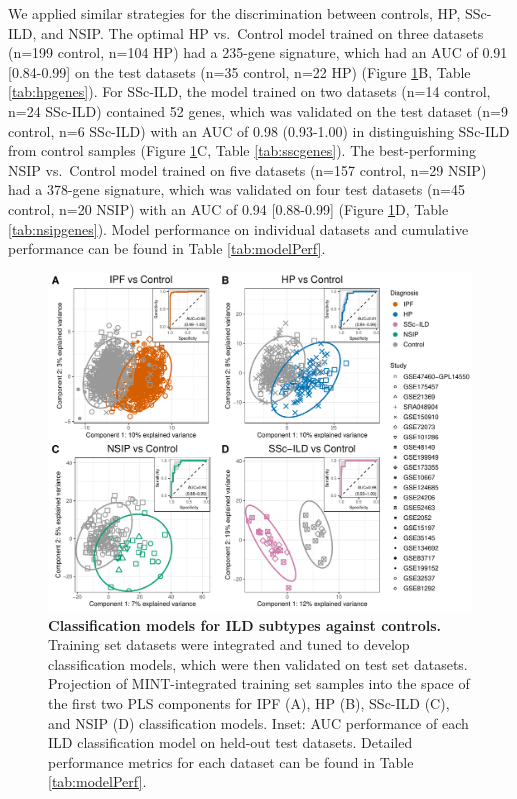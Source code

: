 \documentclass[
]{article}
\begin{document}
We applied similar strategies for the discrimination between controls, HP, SSc-ILD, and NSIP. The optimal HP vs.~Control model trained on three datasets (n=199 control, n=104 HP) had a 235-gene signature, which had an AUC of 0.91 {[}0.84-0.99{]} on the test datasets (n=35 control, n=22 HP) (Figure \ref{fig:mintmodel}B, Table \ref{tab:hpgenes}). For SSc-ILD, the model trained on two datasets (n=14 control, n=24 SSc-ILD) contained 52 genes, which was validated on the test dataset (n=9 control, n=6 SSc-ILD) with an AUC of 0.98 (0.93-1.00) in distinguishing SSc-ILD from control samples (Figure \ref{fig:mintmodel}C, Table \ref{tab:sscgenes}). The best-performing NSIP vs.~Control model trained on five datasets (n=157 control, n=29 NSIP) had a 378-gene signature, which was validated on four test datasets (n=45 control, n=20 NSIP) with an AUC of 0.94 {[}0.88-0.99{]} (Figure \ref{fig:mintmodel}D, Table \ref{tab:nsipgenes}). Model performance on individual datasets and cumulative performance can be found in Table \ref{tab:modelPerf}.



\begin{figure}

{\centering \includegraphics[width=1\linewidth,]{./Figures/SysReview/Figure3_MINT} 

}

\caption[MINT models]{\textbf{Classification models for ILD subtypes against controls.} Training set datasets were integrated and tuned to develop classification models, which were then validated on test set datasets. Projection of MINT-integrated training set samples into the space of the first two PLS components for IPF (A), HP (B), SSc-ILD (C), and NSIP (D) classification models. Inset: AUC performance of each ILD classification model on held-out test datasets. Detailed performance metrics for each dataset can be found in Table \ref{tab:modelPerf}.}\label{fig:mintmodel}
\end{figure}
\end{document}
